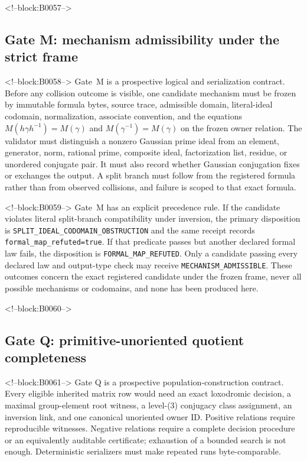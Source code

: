\documentclass[11pt,a4paper]{article}
\begin{document}
<!--block:B0057-->
\subsection{Gate M: mechanism admissibility under the strict frame}

<!--block:B0058-->
Gate~M is a prospective logical and serialization contract. Before any collision outcome is visible, one candidate mechanism must be frozen by immutable formula bytes, source trace, admissible domain, literal-ideal codomain, normalization, associate convention, and the equations \(M(h\gamma h^{-1})=M(\gamma)\) and \(M(\gamma^{-1})=M(\gamma)\) on the frozen owner relation. The validator must distinguish a nonzero Gaussian prime ideal from an element, generator, norm, rational prime, composite ideal, factorization list, residue, or unordered conjugate pair. It must also record whether Gaussian conjugation fixes or exchanges the output. A split branch must follow from the registered formula rather than from observed collisions, and failure is scoped to that exact formula.

<!--block:B0059-->
Gate~M has an explicit precedence rule. If the candidate violates literal split-branch compatibility under inversion, the primary disposition is \texttt{SPLIT\_IDEAL\_CODOMAIN\_OBSTRUCTION} and the same receipt records \texttt{formal\_map\_refuted=true}. If that predicate passes but another declared formal law fails, the disposition is \texttt{FORMAL\_MAP\_REFUTED}. Only a candidate passing every declared law and output-type check may receive \texttt{MECHANISM\_ADMISSIBLE}. These outcomes concern the exact registered candidate under the frozen frame, never all possible mechanisms or codomains, and none has been produced here.

<!--block:B0060-->
\subsection{Gate Q: primitive-unoriented quotient completeness}

<!--block:B0061-->
Gate Q is a prospective population-construction contract. Every eligible inherited matrix row would need an exact loxodromic decision, a maximal group-element root witness, a level-(3) conjugacy class assignment, an inversion link, and one canonical unoriented owner ID. Positive relations require reproducible witnesses. Negative relations require a complete decision procedure or an equivalently auditable certificate; exhaustion of a bounded search is not enough. Deterministic serializers must make repeated runs byte-comparable.
\end{document}
